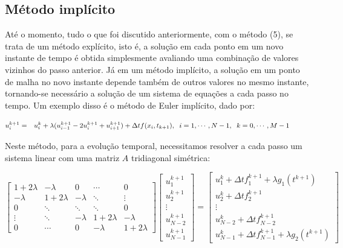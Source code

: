 \documentclass[a4paper, 12pt]{article}
\begin{document}
\subsection{Método implícito}

Até o momento, tudo o que foi discutido anteriormente, com o método (5), se trata de um método explícito, isto é, a solução em cada ponto em um novo instante de tempo é obtida simplesmente avaliando uma combinação de valores vizinhos do passo anterior. Já em um método implícito, a solução em um ponto
de malha no novo instante depende também de outros valores no mesmo instante, tornando-se necessário a solução de um sistema de equações a cada passo no tempo. Um exemplo disso é o método de Euler implícito, dado por:

\begin{eqnarray}
u_{i}^{k+1} & = & u_{i}^{k} + \lambda (u_{i-1}^{k+1} -2u_{i}^{k+1} +u_{i+1}^{k+1}) + \Delta t f(x_i,t_{k+1}), \hspace{0.2cm} i=1,\cdots,N-1, \hspace{0.2cm} k=0,\cdots,M-1 \hspace{1cm}
\end{eqnarray}


Neste método, para a evolução temporal, necessitamos resolver a cada passo um sistema linear com uma matriz $A$ tridiagonal simétrica:


\begin{equation}
\left[\begin{array}{ccccc}
	
	1+2\lambda   & -\lambda     & 0 		 & \cdots    	& 0 			\\ 
	-\lambda     & 1+2\lambda   & -\lambda   &  \ddots  	&  \vdots   	\\ 
	0 			 &  \ddots  	&  \ddots    &  \ddots  	& 0 			\\ 
	 \vdots  	 &  \ddots  	& - \lambda  & 1+2 \lambda  & - \lambda  	\\ 
	0 			 &  \cdots  	& 0 		 & - \lambda  	& 1+2 \lambda 
	
\end{array} \right] 
\left[\begin{array}{c}
u_{1}^{k+1} 			\\ 
u_{2}^{k+1} 			\\ 
\vdots 					\\ 
u_{N-2}^{k+1} 			\\ 
u_{N-1}^{k+1}
\end{array} \right] 
=
\left[\begin{array}{c}
u_{1}^k + \Delta t f_{1}^{k+1} + \lambda g_{1}(t^{k+1}) \\ 
u_{2}^k + \Delta t f_{2}^{k+1} 						 \\ 
\vdots 								 \\ 
u_{N-2}^k + \Delta t f_{N-2}^{k+1} 						 \\ 
u_{N-1}^k + \Delta t f_{N-1}^{k+1} + \lambda g_{2}(t^{k+1})
\end{array} \right] 
\end{equation}
\end{document}
